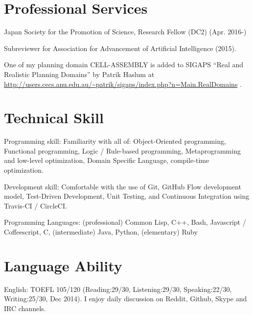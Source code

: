 \documentclass[letterpaper,12pt]{article}
\begin{document}



\section{Professional Services}

Japan Society for the Promotion of Science, Research Fellow (DC2) (Apr. 2016-)

Subreviewer for Association for Advancement of Artificial Intelligence (2015).

One of my planning domain CELL-ASSEMBLY is added to SIGAPS ``Real and
Realistic Planning Domains'' by Patrik Haslum at
\url{http://users.cecs.anu.edu.au/~patrik/sigaps/index.php?n=Main.RealDomains}
.

\section{Technical Skill}

\begin{CV}
 \item[Programming skill:] Familiarity with all of: 
 Object-Oriented programming,
 Functional programming,
 Logic / Rule-based programming,
 Metaprogramming and low-level optimization,
 Domain Specific Language, compile-time optimization.
 \item[Development skill:] Comfortable with the use of Git,
 GitHub Flow development model, Test-Driven Development, Unit
 Testing, and Continuous Integration using Travis-CI / CircleCI.
 \item[Programming Languages:]
 (professional) Common Lisp, C++, Bash, Javascript / Coffeescript, C,
 (intermediate) Java, Python,
 (elementary)   Ruby
\end{CV}

\section{Language Ability}

\begin{CV}
 \item[English:] TOEFL 105/120 (Reading:29/30, Listening:29/30,
 Speaking:22/30, Writing:25/30, Dec 2014). I enjoy daily discussion
 on Reddit, Github, Skype and IRC channels.
\end{CV}
\end{document}
